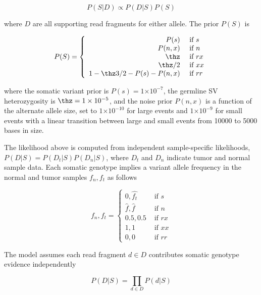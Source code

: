 \documentclass{article}
\newcommand{\e}[1]{\ensuremath{\times 10^{#1}}}
\begin{document}
\begin{equation*}
P( S \vert D ) \propto P( D \vert S )  P (S)
\end{equation*}

\noindent
where $D$ are all supporting read fragments for either allele. The prior $P(S)$ is

\begin{equation*}
P ( S ) =
\left\{
\begin{array}{rl}
P ( s )  & \mbox{ if $s$} \\
P ( n , x )  & \mbox{ if $n$} \\
\thz      & \mbox{ if $rx$} \\
\thz / 2  & \mbox{ if $xx$} \\
1 - \thz 3 / 2 - P(s) - P(n,x)  & \mbox{ if $rr$}
\end{array}
\right.
\end{equation*}

\noindent
where the somatic variant prior is $P(s) = 1\e{-7}$, the germline SV heterozygosity is $\thz = 1\e{-5}$, and the noise prior $P(n,x)$ is a function of the alternate allele size, set to $1\e{-10}$ for large events and $1\e{-9}$ for small events with a linear transition between large and small events from 10000 to 5000 bases in size.

The likelihood above is computed from independent sample-specific likelihoods, $P( D \vert S ) = P( D_t \vert S )P( D_n \vert S )$, where $D_t$ and $D_n$ indicate tumor and normal sample data. Each somatic genotype implies a variant allele frequency in the normal and tumor samples $f_n,f_t$ as follows

\begin{equation*}
f_n, f_t =
\left\{
\begin{array}{rl}
0, \hat{f_t} & \mbox{ if $s$} \\
\hat{f}, \hat{f} & \mbox{ if $n$} \\
0.5, 0.5 & \mbox{ if $rx$} \\
1, 1 & \mbox{ if $xx$} \\
0, 0 & \mbox{ if $rr$}
\end{array}
\right.
\end{equation*}

The model assumes each read fragment $d \in D$ contributes somatic genotype evidence independently

\begin{equation*}
P(D \vert S) = \prod_{d \in D} P(d \vert S)
\end{equation*}
\end{document}
